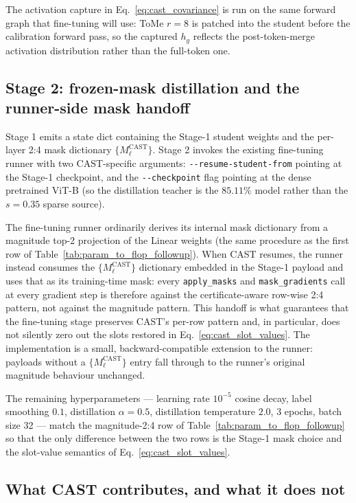 \documentclass[11pt]{article}
\theoremstyle{plain}
\theoremstyle{definition}
\theoremstyle{remark}
\newcommand{\1}{\mathbf{1}}
\begin{document}
The activation capture in Eq.~\eqref{eq:cast_covariance} is run on the same forward graph that fine-tuning will use: ToMe \(r=8\) is patched into the student before the calibration forward pass, so the captured \(h_g\) reflects the post-token-merge activation distribution rather than the full-token one.

\subsection{Stage 2: frozen-mask distillation and the runner-side mask handoff}
\label{subsec:cast_stage2}

Stage 1 emits a state dict containing the Stage-1 student weights and the per-layer 2:4 mask dictionary \(\{M^{\mathrm{CAST}}_\ell\}\).  Stage 2 invokes the existing fine-tuning runner with two CAST-specific arguments: \texttt{-{}-resume-student-from} pointing at the Stage-1 checkpoint, and the \texttt{-{}-checkpoint} flag pointing at the dense pretrained ViT-B (so the distillation teacher is the \(85.11\%\) model rather than the \(s=0.35\) sparse source).

The fine-tuning runner ordinarily derives its internal mask dictionary from a magnitude top-2 projection of the Linear weights (the same procedure as the first row of Table~\ref{tab:param_to_flop_followup}).  When CAST resumes, the runner instead consumes the \(\{M^{\mathrm{CAST}}_\ell\}\) dictionary embedded in the Stage-1 payload and uses that as its training-time mask: every \texttt{apply\_masks} and \texttt{mask\_gradients} call at every gradient step is therefore against the certificate-aware row-wise 2:4 pattern, not against the magnitude pattern.  This handoff is what guarantees that the fine-tuning stage preserves CAST's per-row pattern and, in particular, does not silently zero out the slots restored in Eq.~\eqref{eq:cast_slot_values}.  The implementation is a small, backward-compatible extension to the runner: payloads without a \(\{M^{\mathrm{CAST}}_\ell\}\) entry fall through to the runner's original magnitude behaviour unchanged.

The remaining hyperparameters --- learning rate \(10^{-5}\) cosine decay, label smoothing \(0.1\), distillation \(\alpha=0.5\), distillation temperature \(2.0\), 3 epochs, batch size 32 --- match the magnitude-2:4 row of Table~\ref{tab:param_to_flop_followup} so that the only difference between the two rows is the Stage-1 mask choice and the slot-value semantics of Eq.~\eqref{eq:cast_slot_values}.

\subsection{What CAST contributes, and what it does not}
\label{subsec:cast_limits}
\end{document}
